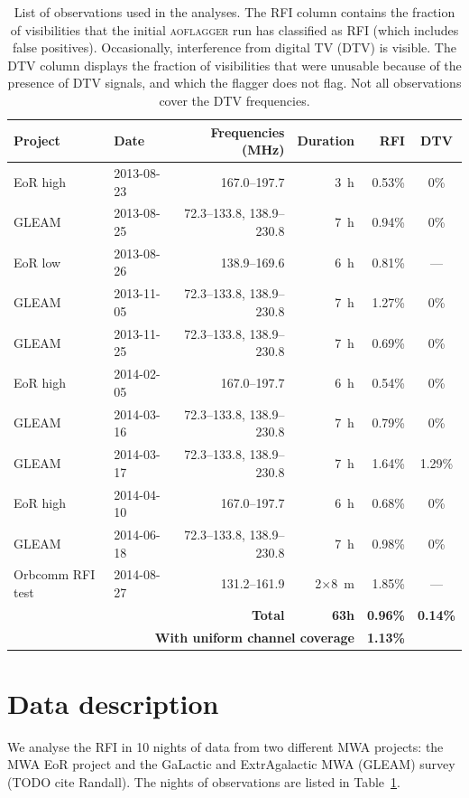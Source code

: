 \documentclass{pasa}
\begin{document}
\begin{table}
\caption{List of observations used in the analyses. The RFI column contains the fraction of visibilities that the initial \textsc{aoflagger} run has classified as RFI (which includes false positives). Occasionally, interference from digital TV (DTV) is visible. The DTV column displays the fraction of visibilities that were unusable because of the presence of DTV signals, and which the flagger does not flag. Not all observations cover the DTV frequencies.}\label{tbl:obs-list}
\begin{center}%
\begin{tabular}{|l|l|r|r|r|c|}
\hline
\textbf{Project} &\textbf{Date} & \textbf{Frequencies (MHz)} & \textbf{Duration} & RFI & DTV \\
\hline
EoR high& 2013-08-23 & 167.0--197.7              & 3~h & 0.53\% & 0\% \\
GLEAM & 2013-08-25 & 72.3--133.8, 138.9--230.8 & 7~h & 0.94\% & 0\% \\
EoR low& 2013-08-26 & 138.9--169.6              & 6~h & 0.81\% & ---\\
GLEAM & 2013-11-05 & 72.3--133.8, 138.9--230.8 & 7~h & 1.27\% & 0\% \\
GLEAM & 2013-11-25 & 72.3--133.8, 138.9--230.8 & 7~h & 0.69\% & 0\% \\
EoR high& 2014-02-05 & 167.0--197.7              & 6~h & 0.54\% & 0\%\\
GLEAM & 2014-03-16 & 72.3--133.8, 138.9--230.8 & 7~h & 0.79\% & 0\% \\
GLEAM & 2014-03-17 & 72.3--133.8, 138.9--230.8 & 7~h & 1.64\% & 1.29\% \\
EoR high& 2014-04-10 & 167.0--197.7              & 6~h & 0.68\% & 0\%\\
GLEAM & 2014-06-18 & 72.3--133.8, 138.9--230.8 & 7~h & 0.98\% & 0\% \\
Orbcomm RFI test&2014-08-27& 131.2--161.9     & 2$\times$8~m& 1.85\% & --- \\
\hline
\multicolumn{3}{|r|}{\textbf{Total}} & \textbf{63h} & \textbf{0.96\%} & \textbf{0.14\%}\\
\hline
\multicolumn{4}{|r|}{\textbf{With uniform channel coverage}} & \textbf{1.13\%} & \\
\hline
\end{tabular}
\end{center}
\end{table}

\section{Data description} \label{ch:data-description}
We analyse the RFI in 10 nights of data from two different MWA projects: the MWA EoR project \citep{bowman-science-with-the-mwa-2013} and the GaLactic and ExtrAgalactic MWA (GLEAM) survey (TODO cite Randall). The nights of observations are listed in Table~\ref{tbl:obs-list}.
\end{document}
